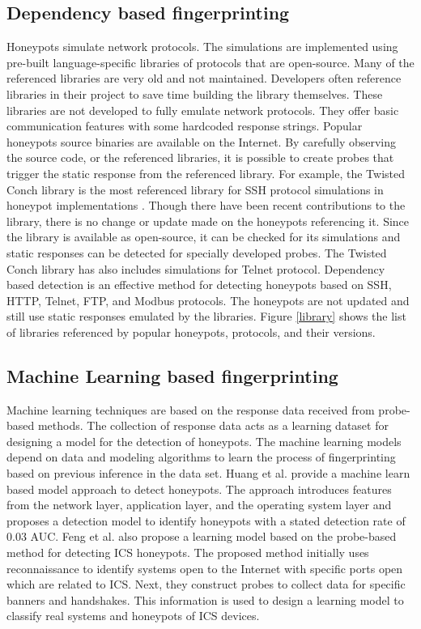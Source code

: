 \subsection{Dependency based fingerprinting}
Honeypots simulate network protocols. The simulations are implemented using pre-built language-specific libraries of protocols that are open-source. Many of the referenced libraries are very old and not maintained. Developers often reference libraries in their project to save time building the library themselves. These libraries are not developed to fully emulate network protocols. They offer basic communication features with some hardcoded response strings. Popular honeypots source binaries are available on the Internet. By carefully observing the source code, or the referenced libraries, it is possible to create probes that trigger the static response from the referenced library. For example, the Twisted Conch\cite{twisted}  library is the most referenced library for SSH protocol simulations in honeypot implementations \cite{counting}. Though there have been recent contributions to the library, there is no change or update made on the honeypots referencing it. Since the library is available as open-source, it can be checked for its simulations and static responses can be detected for specially developed probes. The Twisted Conch library has also includes simulations for Telnet protocol. Dependency based detection is an effective method for detecting honeypots based on SSH, HTTP, Telnet, FTP, and Modbus protocols. The honeypots are not updated and still use static responses emulated by the libraries. Figure \ref{library} \cite{Vetterl2018} shows the list of libraries referenced by popular honeypots, protocols, and their versions. 



\subsection{Machine Learning based fingerprinting}
Machine learning techniques are based on the response data received from probe-based methods. The collection of response data acts as a learning dataset for designing a model for the detection of honeypots. The machine learning models depend on data and modeling algorithms to learn the process of fingerprinting based on previous inference in the data set. Huang et al. \cite{huang} provide a machine learn based model approach to detect honeypots. The approach introduces features from the network layer, application layer, and the operating system layer and proposes a detection model to identify honeypots with a stated detection rate of 0.03 AUC. Feng et al. \cite{Feng2016} also propose a learning model based on the probe-based method for detecting ICS honeypots. The proposed method initially uses reconnaissance to identify systems open to the Internet with specific ports open which are related to ICS. Next, they construct probes to collect data for specific banners and handshakes. This information is used to design a learning model to classify real systems and honeypots of ICS devices.

